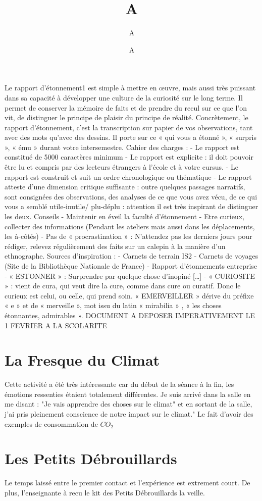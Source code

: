 \documentclass[12pt]{report}
\title{#1}
\author{#2}
\date{#3}
\newcommand{\setHeader}[3]{
\title{#1}
\author{#2}
\date{#3}
\maketitle
}
\begin{document}
\setHeader{A}{A}{A}
\tableofcontents
\setcounter{page}{2}
Le rapport d’étonnement1 est simple à mettre en œuvre, mais aussi très puissant dans sa
capacité à développer une culture de la curiosité sur le long terme. Il permet de conserver la mémoire
de faits et de prendre du recul sur ce que l’on vit, de distinguer le principe de plaisir du principe de
réalité.
Concrètement, le rapport d’étonnement, c’est la transcription sur papier de vos observations,
tant avec des mots qu’avec des dessins. Il porte sur ce « qui vous a étonné », « surpris », « ému » durant
votre intersemestre.
Cahier des charges :
- Le rapport est constitué de 5000 caractères minimum
- Le rapport est explicite : il doit pouvoir être lu et compris par des lecteurs étrangers à l’école
et à votre cursus.
- Le rapport est construit et suit un ordre chronologique ou thématique
- Le rapport atteste d’une dimension critique suffisante : outre quelques passages narratifs,
sont consignées des observations, des analyses de ce que vous avez vécu, de ce qui vous a
semblé utile-inutile/ plu-déplu : attention il est très inspirant de distinguer les deux.
Conseils
- Maintenir en éveil la faculté d’étonnement
- Etre curieux, collecter des informations (Pendant les ateliers mais aussi dans les déplacements,
les à-côtés)
- Pas de « procrastination » : N’attendez pas les derniers jours pour rédiger, relevez régulièrement
des faits sur un calepin à la manière d’un ethnographe.
Sources d’inspiration :
- Carnets de terrain IS2
- Carnets de voyages (Site de la Bibliothèque Nationale de France)
- Rapport d’étonnements entreprise
- « ESTONNER » : Surprendre par quelque chose d’inopiné […]
- « CURIOSITE » : vient de cura, qui veut dire la cure, comme dans cure ou curatif. Donc le curieux
est celui, ou celle, qui prend soin. « EMERVEILLER » dérive du préfixe « e » et de « merveille »,
mot issu du latin « mirabilia » , « les choses étonnantes, admirables ».
DOCUMENT A DEPOSER IMPERATIVEMENT LE 1 FEVRIER A LA SCOLARITE
\newpage



\newcommand{\pd}{Petits Débrouillards }


\section{La Fresque du Climat}

Cette activité a été très intéressante car du début de la séance à la fin, les émotions ressenties étaient totalement différentes.
Je suis arrivé dans la salle en me disant : "Je vais apprendre des choses sur le climat" et en sortant de la salle, j'ai pris
pleinement conscience de notre impact sur le climat." Le fait d'avoir des exemples de consommation de $CO_2$


\section{Les \pd}

Le temps laissé entre le premier contact et l'expérience est extrement court. 
De plus, l'enseignante à recu le kit des \pd la veille.
\end{document}
